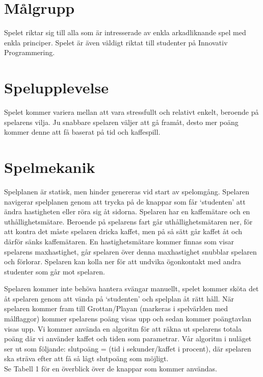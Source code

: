 \documentclass{template}
\begin{document}
\section{Målgrupp}
Spelet riktar sig till alla som är intresserade av enkla arkadliknande spel med enkla principer. Spelet är även väldigt riktat till studenter på Innovativ Programmering.

\section{Spelupplevelse}
Spelet kommer variera mellan att vara stressfullt och relativt enkelt, beroende på spelarens vilja. Ju snabbare spelaren väljer att gå framåt, desto mer poäng kommer denne att få baserat på tid och kaffespill.

\pagebreak

\section{Spelmekanik}
Spelplanen är statisk, men hinder genereras vid start av spelomgång. Spelaren navigerar spelplanen genom att trycka på de knappar som får `studenten' att ändra hastigheten eller röra sig åt sidorna. Spelaren har en kaffemätare och en uthållighetsmätare. Beroende på spelarens fart går uthållighetsmätaren ner, för att kontra det måste spelaren dricka kaffet, men på så sätt går kaffet åt och därför sänks kaffemätaren. En hastighetsmätare kommer finnas som visar spelarens maxhastighet, går spelaren över denna maxhastighet snubblar spelaren och förlorar. Spelaren kan kolla ner för att undvika ögonkontakt med andra studenter som går mot spelaren.

Spelaren kommer inte behöva hantera svängar manuellt, spelet kommer sköta det åt spelaren genom att vända på `studenten' och spelplan åt rätt håll. När spelaren kommer fram till Grottan/Playan (markeras i spelvärlden med målflaggor) kommer spelarens poäng visas upp och sedan kommer poängtavlan visas upp. Vi kommer använda en algoritm för att räkna ut spelarens totala poäng där vi använder kaffet och tiden som parametrar. Vår algoritm i nuläget ser ut som följande: slutpoäng = (tid i sekunder/kaffet i procent), där spelaren ska sträva efter att få så lågt slutpoäng som möjligt.
\\Se Tabell 1 för en överblick över de knappar som kommer användas.
\end{document}
